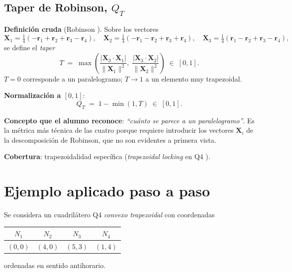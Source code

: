 \documentclass[11pt,a4paper]{article}
\begin{document}
\subsection{Taper de Robinson, $Q_T$}

\textbf{Definici\'on cruda} (Robinson \cite{Robinson1987}). Sobre los vectores
\[
  \bm{X}_1 = \tfrac{1}{4}(-\bm{r}_1+\bm{r}_2+\bm{r}_3-\bm{r}_4),\quad
  \bm{X}_2 = \tfrac{1}{4}(-\bm{r}_1-\bm{r}_2+\bm{r}_3+\bm{r}_4),\quad
  \bm{X}_3 = \tfrac{1}{4}( \bm{r}_1-\bm{r}_2+\bm{r}_3-\bm{r}_4),
\]
se define el \textit{taper}
\[
  T \;=\; \max\!\left( \frac{|\bm{X}_3\!\cdot\!\bm{X}_1|}{\lVert\bm{X}_1\rVert^2},\;
                       \frac{|\bm{X}_3\!\cdot\!\bm{X}_2|}{\lVert\bm{X}_2\rVert^2} \right) \;\in\;[0,1].
\]
$T=0$ corresponde a un paralelogramo; $T\!\to\!1$ a un elemento muy trapezoidal.

\textbf{Normalizaci\'on a $[0,1]$}:
\begin{equation}\boxed{\;
  Q_T \;=\; 1 - \min(1,T) \;\in\;[0,1].
\;}\label{eq:QT}\end{equation}

\textbf{Concepto que el alumno reconoce}: \emph{\textquotedblleft cu\'anto se parece a un
paralelogramo\textquotedblright}. Es la m\'etrica m\'as t\'ecnica de las cuatro porque requiere
introducir los vectores $\bm{X}_i$ de la descomposici\'on de Robinson, que no son evidentes a
primera vista.

\textbf{Cobertura}: trapezoidalidad espec\'ifica (\textit{trapezoidal locking} en Q4
\cite{MacNeal1989}).

\section{Ejemplo aplicado paso a paso}\label{sec:ejemplo}

Se considera un cuadril\'atero Q4 \emph{convexo trapezoidal} con coordenadas
\begin{center}
\begin{tabular}{cccc}
\toprule
$N_1$ & $N_2$ & $N_3$ & $N_4$ \\
\midrule
$(0,0)$ & $(4,0)$ & $(5,3)$ & $(1,4)$ \\
\bottomrule
\end{tabular}
\end{center}
ordenadas en sentido antihorario.
\end{document}
